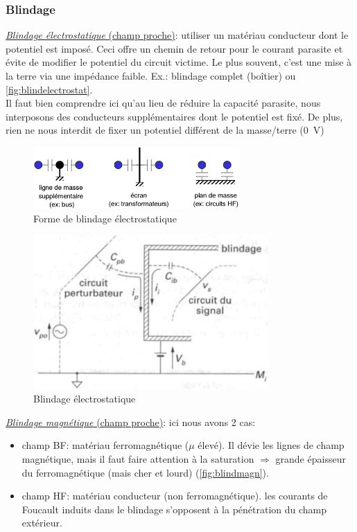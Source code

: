 \subsubsection{Blindage}
\underline{\textit{Blindage électrostatique} (champ proche)}: utiliser un matériau conducteur dont le potentiel est imposé. Ceci offre un chemin de retour pour le courant parasite et évite de modifier le potentiel du circuit victime. Le plus souvent, c'est une mise à la terre via une impédance faible. Ex.: blindage complet (boîtier) ou \autoref{fig:blindelectrostat}.\\
Il faut bien comprendre ici qu'au lieu de réduire la capacité parasite, nous interposons des conducteurs supplémentaires dont le potentiel est fixé. De plus, rien ne nous interdit de fixer un potentiel différent de la masse/terre (\SI{0}{\volt})
\begin{figure}[H] 
	\centering 
	\includegraphics[width=0.7\textwidth,height=10\baselineskip,keepaspectratio]{ch3/image6} 
	\caption{Forme de blindage électrostatique}
	\label{fig:blindelectrostat}
\end{figure}
\begin{figure}[H] 
	\centering 
	\includegraphics[width=0.8\textwidth,height=10\baselineskip,keepaspectratio]{ch3/image7} 
	\caption{Blindage électrostatique}
\end{figure}
\underline{\textit{Blindage magnétique} (champ proche)}: ici nous avons 2 cas:
\begin{itemize}
	\item champ BF: matériau ferromagnétique (\(\mu\) élevé). Il dévie les lignes de champ magnétique, mais il faut faire attention à la saturation \(\Rightarrow\) grande épaisseur du ferromagnétique (mais cher et lourd) (\autoref{fig:blindmagn}).
	\item champ HF: matériau conducteur (non ferromagnétique). les courants de Foucault induits dans le blindage s'opposent à la pénétration du champ extérieur.
\end{itemize}
